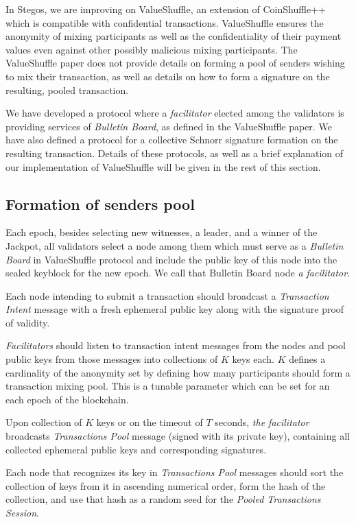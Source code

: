 \documentclass[a4paper, 10pt, conference]{ieeeconf}
\begin{document}
In Stegos, we are improving on ValueShuffle\cite{c19}, an extension of CoinShuffle++ which is compatible with confidential transactions. ValueShuffle ensures the anonymity of mixing participants as well as the confidentiality of their payment values even against other possibly malicious mixing participants. The ValueShuffle paper does not provide details on forming a pool of senders wishing to mix their transaction, as well as details on how to form a signature on the resulting, pooled transaction. 

We have developed a protocol where a \textit{facilitator} elected among the validators is providing services of \textit{Bulletin Board}, as defined in the ValueShuffle paper. We have also defined a protocol for a collective Schnorr signature\cite{c22} formation on the resulting transaction. Details of these protocols, as well as a brief explanation of our implementation of ValueShuffle will be given in the rest of this section.

\subsection{Formation of senders pool}
Each epoch, besides selecting new witnesses, a leader, and a winner of the Jackpot, all validators select a node among them which must serve as a \textit{Bulletin Board} in ValueShuffle protocol and include the public key of this node into the sealed keyblock for the new epoch. We call that Bulletin Board node \textit{a facilitator}.

Each node intending to submit a transaction should broadcast a \textit{Transaction Intent} message with a fresh ephemeral public key along with the signature proof of validity.

\textit{Facilitators} should listen to transaction intent messages from the nodes and pool public keys from those messages into collections of $K$ keys each. $K$ defines a cardinality of the anonymity set by defining how many participants should form a transaction mixing pool. This is a tunable parameter which can be set for an each epoch of the blockchain. 

Upon collection of $K$ keys or on the timeout of $T$ seconds, \textit{the facilitator} broadcasts \textit{Transactions Pool} message (signed with its private key), containing all collected ephemeral public keys and corresponding signatures.

Each node that recognizes its key in \textit{Transactions Pool} messages should sort the collection of keys from it in ascending numerical order, form the hash of the collection, and use that hash as a random seed for the \textit{Pooled Transactions Session}.
\end{document}
